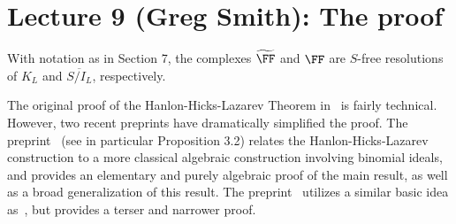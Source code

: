 \documentclass{amsart}
\begin{document}
\section{Lecture 9 (Greg Smith): The proof}\label{lec:9-HHL-proof}

\begin{theorem} \cite{HHL24}\label{thm:HHL-resolution}
With notation as in Section 7, the complexes $\tF$ and $\FF$ are $S$-free resolutions of $K_{L}$ and $\overline{S/I_{L}}$, respectively. 
\end{theorem}

The original proof of the Hanlon-Hicks-Lazarev Theorem in~\cite{HHL24} is fairly technical.  However, two recent preprints have dramatically simplified the proof.  The preprint~\cite{BCHS+25} (see in particular Proposition 3.2) relates the Hanlon-Hicks-Lazarev construction to a more classical algebraic construction involving binomial ideals, and provides an elementary and purely algebraic proof of the main result, as well as a broad generalization of this result.  The preprint~\cite{BH25} utilizes a similar basic idea as~\cite{BCHS+25}, but provides a terser and narrower proof.
\end{document}
